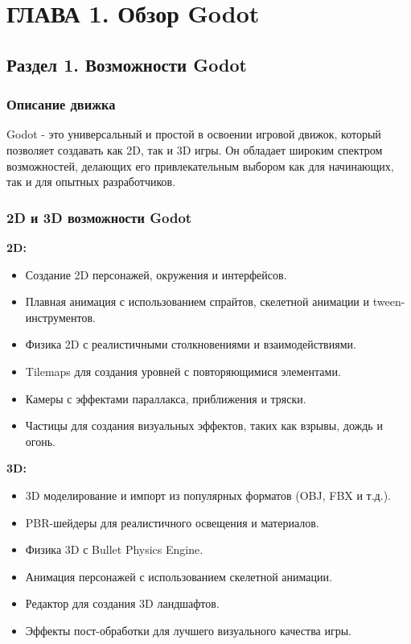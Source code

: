\chapter{\label{ch:ch01}ГЛАВА 1. Обзор Godot} %

\section{\label{sec:ch01/sec01}Раздел 1. Возможности Godot}

\subsection{\label{subsec:ch01/sec01/sub01}Описание движка}

Godot - это универсальный и простой в освоении игровой движок, который позволяет создавать как 2D, так и 3D игры. Он обладает широким спектром возможностей, делающих его привлекательным выбором как для начинающих, так и для опытных разработчиков.

\subsection{\label{subsec:ch01/sec01/sub02}2D и 3D возможности Godot}

\textbf{2D:}

\begin{itemize}
    \item Создание 2D персонажей, окружения и интерфейсов.
    \item Плавная анимация с использованием спрайтов, скелетной анимации и tween-инструментов.
    \item Физика 2D с реалистичными столкновениями и взаимодействиями.
    \item Tilemaps для создания уровней с повторяющимися элементами.
    \item Камеры с эффектами параллакса, приближения и тряски.
    \item Частицы для создания визуальных эффектов, таких как взрывы, дождь и огонь.
\end{itemize}

\textbf{3D:}

\begin{itemize}
    \item 3D моделирование и импорт из популярных форматов (OBJ, FBX и т.д.).
    \item PBR-шейдеры для реалистичного освещения и материалов.
    \item Физика 3D с Bullet Physics Engine.
    \item Анимация персонажей с использованием скелетной анимации.
    \item Редактор для создания 3D ландшафтов.
    \item Эффекты пост-обработки для лучшего визуального качества игры.
\end{itemize}


